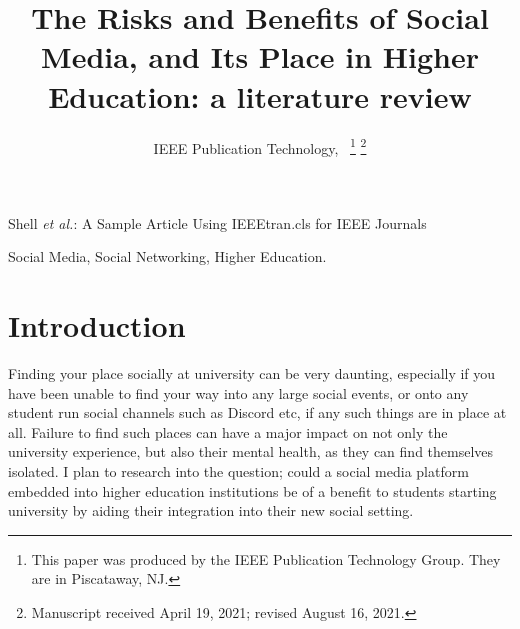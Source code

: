 \documentclass[lettersize,journal]{IEEEtran}
\begin{document}
\title{The Risks and Benefits of Social Media, and Its Place in Higher Education: a literature review}

\author{IEEE Publication Technology,~
\thanks{This paper was produced by the IEEE Publication Technology Group. They are in Piscataway, NJ.}%
\thanks{Manuscript received April 19, 2021; revised August 16, 2021.}}

%
{Shell \MakeLowercase{\textit{et al.}}: A Sample Article Using IEEEtran.cls for IEEE Journals}


\maketitle

\begin{abstract}
\end{abstract}

\begin{IEEEkeywords}
Social Media, Social Networking, Higher Education.
\end{IEEEkeywords}

\section{Introduction}
        Finding your place socially at university can be very daunting,
        especially if you have been unable to find your way into any large
        social events, or onto any student run social channels such as Discord
        etc, if any such things are in place at all. Failure to find such
        places can have a major impact on not only the university experience,
        but also their mental health, as they can find themselves isolated. I
        plan to research into the question; could a social media platform embedded
        into higher education institutions be of a benefit to students starting
        university by aiding their integration into their new social setting.
\end{document}
